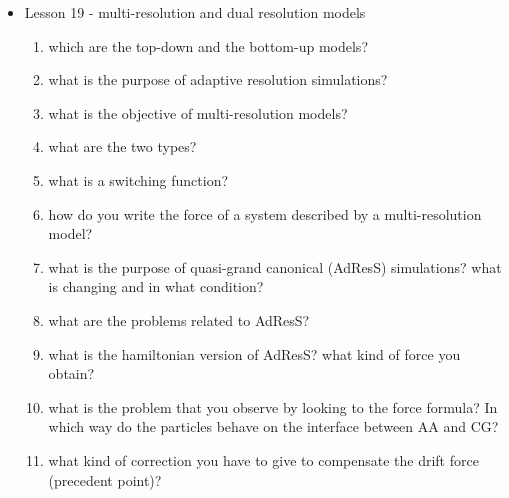 {\begin{itemize}
\begin{enumerate}
        \item where do the knots tend to position themselves? why not on the stationary nodes? 
        \item how can you intend the position of a knot on a length? what type of ... you expect on the stationary points?
        \item what is interesting about knots in proteins? why you don't expect them?
        \item what characteristics are necessary for self-folding? what type of measures do you adopt as a consequence?
        \item what is an elastic folder model? what is its main role?
        \item what is the process through which you evlaluate the folding rate through the elastic folder model
        \item What type of measure do you adopt to evaluate the folding process?
        \item what is the RMSD?
        \item what is a LASSO protein? 
    \end{enumerate}
    \item Lesson 19 - multi-resolution and dual resolution models
    \begin{enumerate}
        \item which are the top-down and the bottom-up models?
        \item what is the purpose of adaptive resolution simulations?
        \item what is the objective of multi-resolution models?
        \item what are the two types?
        \item what is a switching function?
        \item how do you write the force of a system described by a multi-resolution model?
        \item what is the purpose of quasi-grand canonical (AdResS) simulations? what is changing and in what condition?
        \item what are the problems related to AdResS?
        \item what is the hamiltonian version of AdResS? what kind of force you obtain?
        \item what is the problem that you observe by looking to the force formula? In which way do the particles behave on the interface between AA and CG?
        \item what kind of correction you have to give to compensate the drift force (precedent point)?

\end{enumerate}
\end{itemize}}
